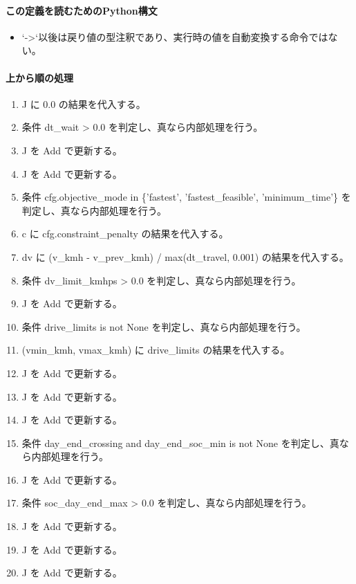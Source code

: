 \documentclass[a4paper,11pt]{article}
\begin{document}
            \paragraph{この定義を読むためのPython構文}
            \begin{itemize}[leftmargin=1.6em]
            \item `->`以後は戻り値の型注釈であり、実行時の値を自動変換する命令ではない。
            \end{itemize}
            \paragraph{上から順の処理}
            \begin{enumerate}[leftmargin=1.8em]
            \item J に 0.0 の結果を代入する。
\item 条件 dt\_wait > 0.0 を判定し、真なら内部処理を行う。
\item   J を Add で更新する。
\item J を Add で更新する。
\item 条件 cfg.objective\_mode in \{'fastest', 'fastest\_feasible', 'minimum\_time'\} を判定し、真なら内部処理を行う。
\item   c に cfg.constraint\_penalty の結果を代入する。
\item   dv に (v\_kmh - v\_prev\_kmh) / max(dt\_travel, 0.001) の結果を代入する。
\item   条件 dv\_limit\_kmhps > 0.0 を判定し、真なら内部処理を行う。
\item     J を Add で更新する。
\item   条件 drive\_limits is not None を判定し、真なら内部処理を行う。
\item     (vmin\_kmh, vmax\_kmh) に drive\_limits の結果を代入する。
\item     J を Add で更新する。
\item     J を Add で更新する。
\item   J を Add で更新する。
\item   条件 day\_end\_crossing and day\_end\_soc\_min is not None を判定し、真なら内部処理を行う。
\item     J を Add で更新する。
\item     条件 soc\_day\_end\_max > 0.0 を判定し、真なら内部処理を行う。
\item       J を Add で更新する。
\item   J を Add で更新する。
\item   J を Add で更新する。

\end{enumerate}
\end{document}
